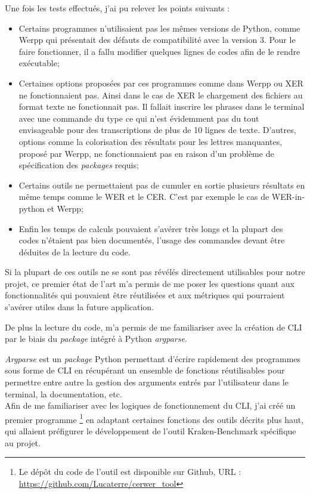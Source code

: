 Une fois les tests effectués, j'ai pu relever les points suivants :
\begin{itemize}
    \item Certains programmes n'utilisaient pas les mêmes versions de Python, comme Werpp qui présentait des défauts de compatibilité avec la version 3. Pour le faire fonctionner, il a fallu modifier quelques lignes de codes afin de le rendre exécutable;
    \item Certaines options proposées par ces programmes comme dans Werpp ou XER ne fonctionnaient pas. Ainsi dans le cas de XER le chargement des fichiers au format texte ne fonctionnait pas. Il fallait inscrire les phrases dans le terminal avec une commande du type  ce qui n'est évidemment pas du tout envisageable pour des transcriptions de plus de 10 lignes de texte. D'autres, options comme la colorisation des résultats pour les lettres manquantes, proposé par Werpp, ne fonctionnaient pas en raison d'un problème de spécification des \textit{packages} requis;
    \item Certains outils ne permettaient pas de cumuler en sortie plusieurs résultats en même temps comme le WER et le CER. C'est par exemple le cas de WER-in-python et Werpp;
    \item Enfin les temps de calculs pouvaient s'avérer très longs et la plupart des codes n'étaient pas bien documentés, l'usage des commandes devant être déduites de la lecture du code.\\
\end{itemize}
\medskip
Si la plupart de ces outils ne se sont pas révélés directement utilisables pour notre projet, ce premier état de l'art m'a permis de me poser les questions quant aux fonctionnalités qui pouvaient être réutilisées et aux métriques qui pourraient s'avérer utiles dans la future application. 

De plus la lecture du code, m'a permis de me familiariser avec la création de CLI par le biais du \textit{package} intégré à Python \textit{argparse}. 

\textit{Argparse} est un \textit{package} Python permettant d'écrire rapidement des programmes sous forme de CLI en récupérant un ensemble de fonctions réutilisables pour permettre entre autre la gestion des arguments entrés par l'utilisateur dans le terminal, la documentation, etc.\\

Afin de me familiariser avec les logiques de fonctionnement du CLI, j'ai créé un premier programme \footnote{Le dépôt du code de l'outil  est disponible sur Github, URL : \url{https://github.com/Lucaterre/cerwer_tool}} en adaptant certaines fonctions des outils décrits plus haut, qui allaient préfigurer le développement de l'outil Kraken-Benchmark spécifique au projet.\\

